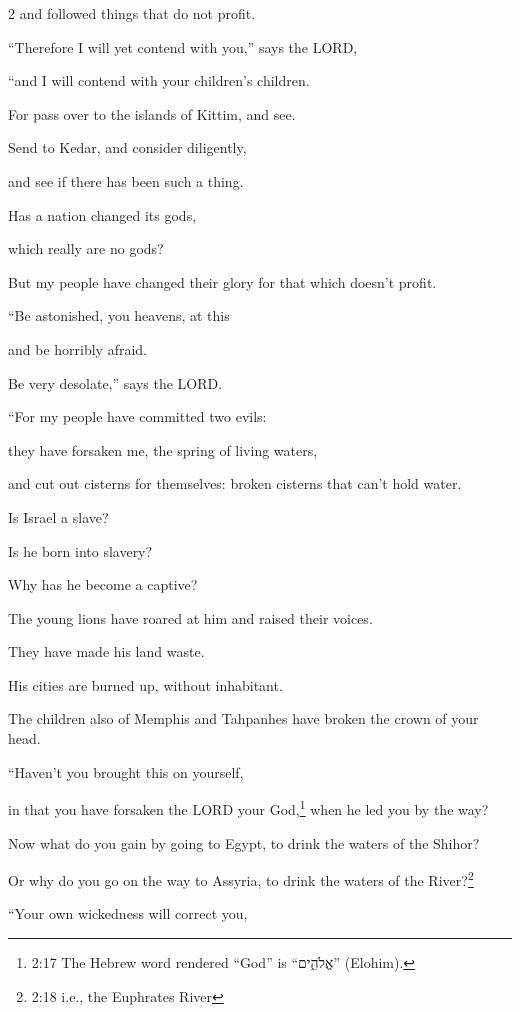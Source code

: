 \begin{multicols}{2}
	and followed things that do not profit.
	
	
	\myverse{}“Therefore I will yet contend with you,” says the LORD,
	
	“and I will contend with your children’s children.
	
	
	\myverse{}For pass over to the islands of Kittim, and see.
	
	Send to Kedar, and consider diligently,
	
	and see if there has been such a thing.
	
	
	\myverse{}Has a nation changed its gods,
	
	which really are no gods?
	
	But my people have changed their glory for that which doesn’t profit.
	
	
	\myverse{}“Be astonished, you heavens, at this
	
	and be horribly afraid.
	
	Be very desolate,” says the LORD.
	
	
	\myverse{}“For my people have committed two evils:
	
	they have forsaken me, the spring of living waters,
	
	and cut out cisterns for themselves: broken cisterns that can’t hold water.
	
	
	\myverse{}Is Israel a slave?
	
	Is he born into slavery?
	
	Why has he become a captive?
	
	
	\myverse{}The young lions have roared at him and raised their voices.
	
	They have made his land waste.
	
	His cities are burned up, without inhabitant.
	
	
	\myverse{}The children also of Memphis and Tahpanhes have broken
	the crown of your head.
	
	
	\myverse{}“Haven’t you brought this on yourself,
	
	in that you have forsaken the LORD your God,\footnote{2:17 The Hebrew word rendered “God” is “אֱלֹהִ֑ים” (Elohim).} when he led you by
	the way?
	
	
	\myverse{}Now what do you gain by going to Egypt, to drink the waters
	of the Shihor?
	
	Or why do you go on the way to Assyria, to drink the waters of the River?\footnote{2:18 i.e., the Euphrates River}
	
	
	\myverse{}“Your own wickedness will correct you,
	

\end{multicols}
